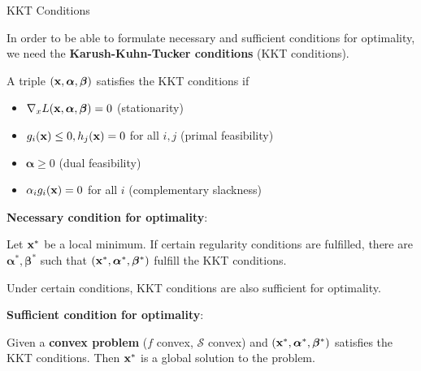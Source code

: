 \documentclass[11pt,compress,t,notes=noshow, xcolor=table]{beamer}
\begin{document}
\begin{vbframe}{KKT Conditions}

In order to be able to formulate necessary and sufficient conditions for optimality, we need the \textbf{Karush-Kuhn-Tucker conditions} (KKT conditions).

\lz

A triple $(\mathbf{x}, \bm{\alpha}, \bm{\beta})$ satisfies the KKT conditions if

  \begin{itemize}
    \item $\nabla_x L(\mathbf{x}, \bm{\alpha}, \bm{\beta}) = 0$ (stationarity)
    \item $g_i(\mathbf{x}) \le 0, h_j(\mathbf{x}) = 0$ for all $i, j$ (primal feasibility)
    \item $\bm{\alpha} \ge 0$ (dual feasibility)
    \item $\alpha_i g_i(\mathbf{x}) = 0$ for all $i$ (complementary slackness)
  \end{itemize}



  \framebreak


\textbf{Necessary condition for optimality}:

Let $\mathbf{x}^*$ be a local minimum. If certain regularity conditions are fulfilled, there are $\bm{\alpha}^*, \bm{\beta}^*$ such that $(\mathbf{x}^*, \bm{\alpha}^*, \bm{\beta}^*)$ fulfill the KKT conditions.

  \lz

  Under certain conditions, KKT conditions are also sufficient for optimality.

  \lz

  \textbf{Sufficient condition for optimality}:

  Given a \textbf{convex problem} ($f$ convex, $\mathcal{S}$ convex) and $(\mathbf{x}^*, \bm{\alpha}^*, \bm{\beta}^*)$ satisfies the KKT conditions. Then $\mathbf{x}^*$ is a global solution to the problem.




\end{vbframe}
\end{document}
